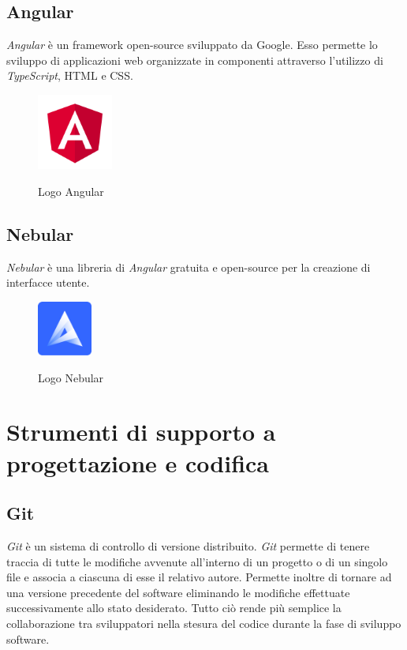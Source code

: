	\subsection{Angular}
	\emph{Angular} è un \gls{framework} open-source sviluppato da Google. Esso permette lo sviluppo di applicazioni web organizzate in componenti attraverso l'utilizzo di \emph{TypeScript}, \gls{HTML} e \gls{CSS}.
	
	\begin{figure}[H]
		\centering
		\includegraphics[width=2.5cm]{immagini/angular.png} \\
		\caption{\label{fig:logo_angular} Logo Angular}
	\end{figure}

	\subsection{Nebular}
	\emph{Nebular} è una libreria di \emph{Angular} gratuita e open-source per la creazione di interfacce utente.
	
	\begin{figure}[H]
		\centering
		\includegraphics[width=1.8cm]{immagini/nebular.png} \\
		\caption{\label{fig:logo_nebular} Logo Nebular}
	\end{figure}


\section{Strumenti di supporto a progettazione e codifica}
	\subsection{Git}
	\emph{Git} è un sistema di \gls{controllo di versione} distribuito. \emph{Git} permette di tenere traccia di tutte le modifiche avvenute all'interno di un progetto o di un singolo file e associa a ciascuna di esse il relativo autore. Permette inoltre di tornare ad una versione precedente del software eliminando le modifiche effettuate successivamente allo stato desiderato. Tutto ciò rende più semplice la collaborazione tra sviluppatori nella stesura del codice durante la fase di sviluppo software.
	
